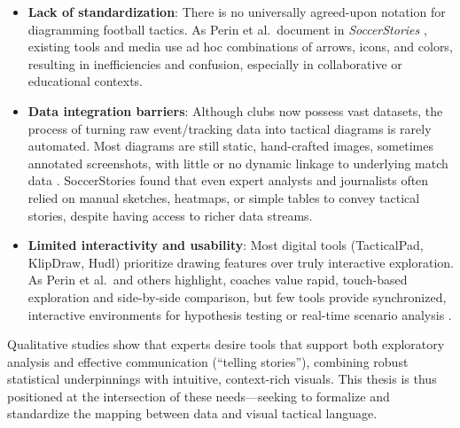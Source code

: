 \documentclass[11pt,a4paper,openright]{report}
\begin{document}
\begin{itemize}
    \item \textbf{Lack of standardization}: There is no universally agreed-upon notation for diagramming football tactics. As Perin et al.\ document in \textit{SoccerStories} \cite{perin2013soccerstories}, existing tools and media use ad hoc combinations of arrows, icons, and colors, resulting in inefficiencies and confusion, especially in collaborative or educational contexts.
    \item \textbf{Data integration barriers}: Although clubs now possess vast datasets, the process of turning raw event/tracking data into tactical diagrams is rarely automated. Most diagrams are still static, hand-crafted images, sometimes annotated screenshots, with little or no dynamic linkage to underlying match data \cite{sarmento2014match, perin2013soccerstories}. SoccerStories found that even expert analysts and journalists often relied on manual sketches, heatmaps, or simple tables to convey tactical stories, despite having access to richer data streams.
    \item \textbf{Limited interactivity and usability}: Most digital tools (TacticalPad, KlipDraw, Hudl) prioritize drawing features over truly interactive exploration. As Perin et al.\ and others highlight, coaches value rapid, touch-based exploration and side-by-side comparison, but few tools provide synchronized, interactive environments for hypothesis testing or real-time scenario analysis \cite{perin2013soccerstories, maiden2023designing}.
\end{itemize}

Qualitative studies \cite{perin2013soccerstories} show that experts desire tools that support both exploratory analysis and effective communication (“telling stories”), combining robust statistical underpinnings with intuitive, context-rich visuals. This thesis is thus positioned at the intersection of these needs—seeking to formalize and standardize the mapping between data and visual tactical language.

\end{document}
